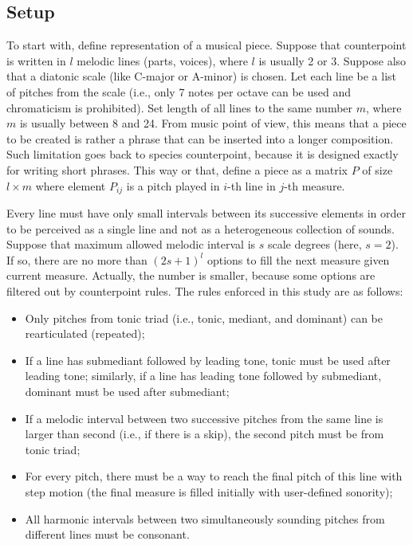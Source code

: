 \documentclass{article}
\begin{document}
\subsection{Setup}
\label{subsec:setup}

To start with, define representation of a musical piece. Suppose that counterpoint is written in $l$ melodic lines (parts, voices), where $l$ is usually 2 or 3. Suppose also that a diatonic scale (like C-major or A-minor) is chosen. Let each line be a list of pitches from the scale (i.e., only 7 notes per octave can be used and chromaticism is prohibited). Set length of all lines to the same number $m$, where $m$ is usually between 8 and 24. From music point of view, this means that a piece to be created is rather a phrase that can be inserted into a longer composition. Such limitation goes back to species counterpoint, because it is designed exactly for writing short phrases. This way or that, define a piece as a matrix $P$ of size $l \times m$ where element $P_{ij}$ is a pitch played in $i$-th line in $j$-th measure.


Every line must have only small intervals between its successive elements in order to be perceived as a single line and not as a heterogeneous collection of sounds. Suppose that maximum allowed melodic interval is $s$ scale degrees (here, $s = 2$). If so, there are no more than $(2s + 1)^l$ options to fill the next measure given current measure. Actually, the number is smaller, because some options are filtered out by counterpoint rules. The rules enforced in this study are as follows:
\begin{itemize}
	\item Only pitches from tonic triad (i.e., tonic, mediant, and dominant) can be rearticulated (repeated);
	\item If a line has submediant followed by leading tone, tonic must be used after leading tone; similarly, if a line has leading tone followed by submediant, dominant must be used after submediant;
	\item If a melodic interval between two successive pitches from the same line is larger than second (i.e., if there is a skip), the second pitch must be from tonic triad;
	\item For every pitch, there must be a way to reach the final pitch of this line with step motion (the final measure is filled initially with user-defined sonority);
	\item All harmonic intervals between two simultaneously sounding pitches from different lines must be consonant.
\end{itemize}
\end{document}
